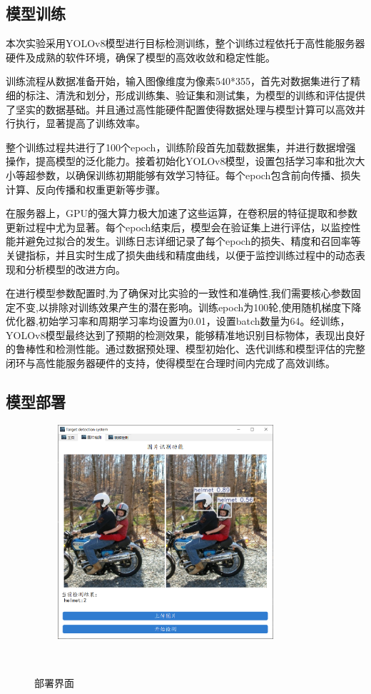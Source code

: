 \documentclass[journal]{IEEEtran}
\begin{document}
\subsection{模型训练}
本次实验采用YOLOv8模型进行目标检测训练，整个训练过程依托于高性能服务器硬件及成熟的软件环境，确保了模型的高效收敛和稳定性能。\par
训练流程从数据准备开始，输入图像维度为像素540*355，首先对数据集进行了精细的标注、清洗和划分，形成训练集、验证集和测试集，为模型的训练和评估提供了坚实的数据基础。并且通过高性能硬件配置使得数据处理与模型计算可以高效并行执行，显著提高了训练效率。\par
整个训练过程共进行了100个epoch，训练阶段首先加载数据集，并进行数据增强操作，提高模型的泛化能力。接着初始化YOLOv8模型，设置包括学习率和批次大小等超参数，以确保训练初期能够有效学习特征。每个epoch包含前向传播、损失计算、反向传播和权重更新等步骤。\par
在服务器上，GPU的强大算力极大加速了这些运算，在卷积层的特征提取和参数更新过程中尤为显著。每个epoch结束后，模型会在验证集上进行评估，以监控性能并避免过拟合的发生。训练日志详细记录了每个epoch的损失、精度和召回率等关键指标，并且实时生成了损失曲线和精度曲线，以便于监控训练过程中的动态表现和分析模型的改进方向。\par
在进行模型参数配置时,为了确保对比实验的一致性和准确性,我们需要核心参数固定不变,以排除对训练效果产生的潜在影响。训练epoch为100轮,使用随机梯度下降优化器,初始学习率和周期学习率均设置为0.01，设置batch数量为64。经训练，YOLOv8模型最终达到了预期的检测效果，能够精准地识别目标物体，表现出良好的鲁棒性和检测性能。通过数据预处理、模型初始化、迭代训练和模型评估的完整闭环与高性能服务器硬件的支持，使得模型在合理时间内完成了高效训练。\par

\subsection{模型部署}
\begin{figure}[htbp] 

   \centering
   \includegraphics[width=8cm]{figures/部署页面.png}
   \caption{部署界面} 
   \label{fig:} 
  
\end{figure} 
\end{document}

